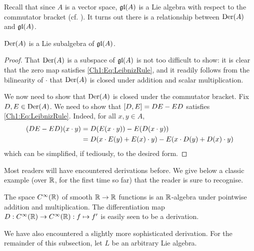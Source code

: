 Recall that since $A$ is a vector space, $\mathfrak{gl}\!\left( A \right)$ is a Lie algebra with respect to the commutator bracket (cf. ). It turns out there is a relationship between $\operatorname{Der}\!\left( A \right)$ and $\mathfrak{gl}\!\left( A \right)$.

\begin{boxproposition}
    $\operatorname{Der}\!\left( A \right)$ is a Lie subalgebra of $\mathfrak{gl}\!\left( A \right)$.
\end{boxproposition}
\begin{proof}
    That $\operatorname{Der}\!\left( A \right)$ is a subspace of $\mathfrak{gl}\!\left( A \right)$ is not too difficult to show: it is clear that the zero map satisfies \eqref{Ch1:Eq:LeibnizRule}, and it readily follows from the bilinearity of $\cdot$ that $\operatorname{Der}\!\left( A \right)$ is closed under addition and scalar multiplication.

    We now need to show that $\operatorname{Der}\!\left( A \right)$ is closed under the commutator bracket. Fix $D, E \in \operatorname{Der}\!\left( A \right)$. We need to show that $\left[ D, E \right] = DE - ED$ satisfies \eqref{Ch1:Eq:LeibnizRule}. Indeed, for all $x, y \in A$,
    \begin{align*}
        \left( DE - ED \right)\!(x \cdot y)
        &= D\!\left( E(x \cdot y) \right) - E\!\left( D(x \cdot y) \right) \\
        &= D\!\left( x \cdot E(y) + E(x) \cdot y \right) - E\!\left( x \cdot D(y) + D(x) \cdot y \right) 
    \end{align*}
    which can be simplified, if tediously, to the desired form.
\end{proof}

Most readers will have encountered derivations before. We give below a classic example (over $\mathbb{R}$, for the first time so far) that the reader is sure to recognise.

\begin{boxexample}
    The space $C^{\infty}(\mathbb{R})$ of smooth $\mathbb{R} \to \mathbb{R}$ functions is an $\mathbb{R}$-algebra under pointwise addition and multiplication. The differentiation map $D : C^{\infty}(\mathbb{R}) \to C^{\infty}(\mathbb{R}) : f \mapsto f'$ is easily seen to be a derivation.
\end{boxexample}

We have also encountered a slightly more sophisticated derivation. For the remainder of this subsection, let $L$ be an arbitrary Lie algebra.

